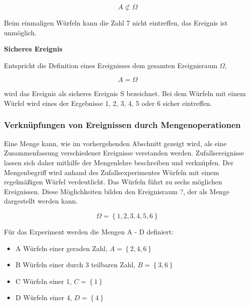 \begin{equation}\label{eq:twofive}
A\not\subset \Omega 
\end{equation}

\noindent Beim einmaligen W\"{u}rfeln kann die Zahl 7 nicht eintreffen, das Ereignis ist unm\"{o}glich. \bigskip

{\selectfont
\noindent\textbf{Sicheres Ereignis}} \smallskip

\noindent Entspricht die Definition eines Ereignisses dem gesamten Ereignisraum $\Omega$,

\begin{equation}\label{eq:twosix}
A=\Omega 
\end{equation}

\noindent wird das Ereignis als sicheres Ereignis S bezeichnet. Bei dem W\"{u}rfeln mit einem W\"{u}rfel wird eines der Ergebnisse 1, 2, 3, 4, 5 oder 6 sicher eintreffen.

\subsubsection{Verkn\"{u}pfungen von Ereignissen durch Mengenoperationen}

\noindent Eine Menge kann, wie im vorhergehenden Abschnitt gezeigt wird, als eine Zusammenfassung verschiedener Ereignisse verstanden werden. Zufallsereignisse lassen sich daher mithilfe der Mengenlehre beschreiben und verkn\"{u}pfen. Der Mengenbegriff wird anhand des Zufallsexperimentes W\"{u}rfeln mit einem regelm\"{a}{\ss}igen W\"{u}rfel verdeutlicht. Das W\"{u}rfeln f\"{u}hrt zu sechs m\"{o}glichen Ereignissen. Diese M\"{o}glichkeiten bilden den Ereignisraum ?, der als Menge dargestellt werden kann.

\begin{equation}\label{eq:twoseven}
\Omega = \left\{1, 2, 3, 4, 5, 6\right\}
\end{equation}

\noindent F\"{u}r das Experiment werden die Mengen A - D definiert:

\begin{itemize}
    \item[] A \qquad Würfeln einer geraden Zahl, $A = \left \{ 2,4,6 \right \}$  
    \item[] B \qquad Würfeln einer durch 3 teilbaren Zahl, $B = \left \{ 3,6 \right \}$
    \item[] C \qquad Würfeln einer 1, $C = \left \{ 1 \right \}$  
    \item[] D \qquad Würfeln einer 4, $D = \left \{ 4 \right \}$ 
\end{itemize}

